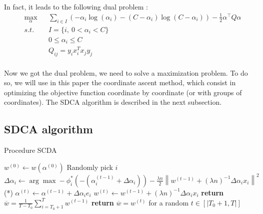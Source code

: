 \documentclass{article}
\newcommand{\norm}[1]{\left\|#1 \right\|}
\begin{document}
\paragraph{}In fact, it leads to the following dual problem :
\begin{equation}
	\begin{aligned}
		& \max_{\alpha} & &\sum_{i \in I} (-\alpha_i \log(\alpha_i) - (C-\alpha_i) \log(C - \alpha_i)) - \frac{1}{2} \alpha^\top Q\alpha\\
		& s.t.          & &I = \{i,\ 0 < \alpha_i < C \}\\
		&               & &0 \leq \alpha_i \leq C \\
		&               & &Q_{ij} = y_i x_i^T x_j y_j
	\end{aligned}
\end{equation}

\paragraph{}Now we got the dual problem, we need to solve a maximization problem.
To do so, we will use in this paper the coordinate ascent method, which consist in optimizing the objective function coordinate by coordinate (or with groups of coordinates).
The SDCA algorithm is described in the next subsection.

\subsection{SDCA algorithm}

\begin{algorithm}[H]
    \caption{Procedure SCDA}
    \begin{algorithmic}
        \State $w^{(0)} \gets w(\alpha^{(0)})$
        \State Randomly pick $i$
        \State $\Delta \alpha_i \gets \arg \max -\phi^{*}_i(-(\alpha_i^{(t-1)}+\Delta \alpha_i))-\frac{\lambda n}{2}\norm{w^{(t-1)}+(\lambda n)^{-1}\Delta \alpha_i x_i}^2$ \qquad \qquad \qquad \qquad \qquad (*)
        \State $\alpha^{(t)} \gets \alpha^{(t-1)} + \Delta \alpha_i e_i$
        \State $w^{(t)} \gets w^{(t-1)} + (\lambda n)^{-1} \Delta \alpha_i x_i$
        \EndFor
        \State \textbf{return} $\overline{w} = \frac{1}{T-T_0} \sum_{i = T_0+1}^T w^{(t-1)}$
        \EndIf
        \State \textbf{return} $\overline{w} = w^{(t)}$ for a random $t \in [|T_0+1, T|]$
        \EndIf
        \EndProcedure
    \end{algorithmic}
\end{algorithm}
\end{document}

